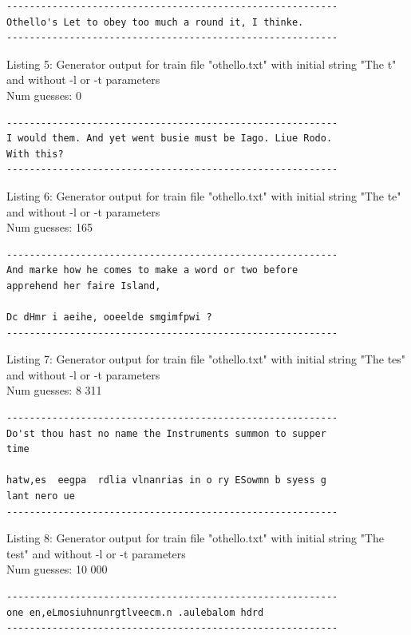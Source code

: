 \documentclass{article}
\begin{document}
\begin{lstlisting}
----------------------------------------------------------
Othello's Let to obey too much a round it, I thinke.
----------------------------------------------------------
\end{lstlisting}

Listing 5: Generator output for train file "othello.txt" with initial string "The t" and without -l or -t parameters
\\Num guesses: 0

\begin{lstlisting}
----------------------------------------------------------
I would them. And yet went busie must be Iago. Liue Rodo. 
With this?
----------------------------------------------------------
\end{lstlisting}

Listing 6: Generator output for train file "othello.txt" with initial string "The te" and without -l or -t parameters
\\Num guesses: 165

\begin{lstlisting}
----------------------------------------------------------
And marke how he comes to make a word or two before 
apprehend her faire Island,

Dc dHmr i aeihe, ooeelde smgimfpwi ? 
----------------------------------------------------------
\end{lstlisting}

Listing 7: Generator output for train file "othello.txt" with initial string "The tes" and without -l or -t parameters
\\Num guesses: 8 311

\begin{lstlisting}
----------------------------------------------------------
Do'st thou hast no name the Instruments summon to supper 
time

hatw,es  eegpa  rdlia vlnanrias in o ry ESowmn b syess g 
lant nero ue 
----------------------------------------------------------
\end{lstlisting}

Listing 8: Generator output for train file "othello.txt" with initial string "The test" and without -l or -t parameters
\\Num guesses: 10 000

\begin{lstlisting}
----------------------------------------------------------
one en,eLmosiuhnunrgtlveecm.n .aulebalom hdrd
----------------------------------------------------------
\end{lstlisting}
\end{document}
